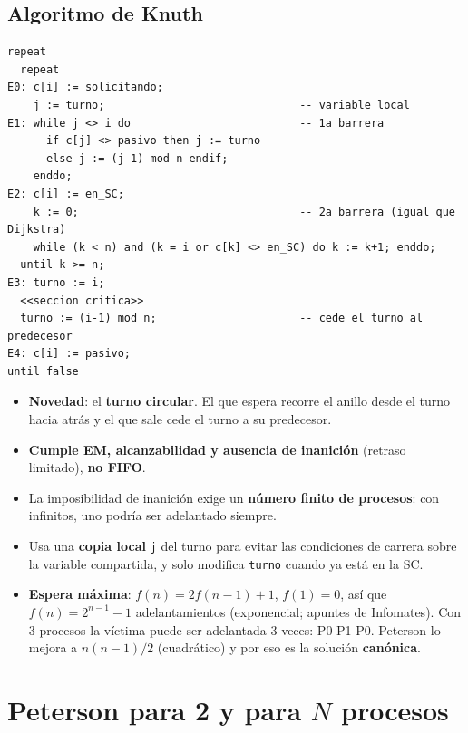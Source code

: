 \documentclass[11pt,a4paper,oneside]{report}
\begin{document}
\subsection{Algoritmo de Knuth}
\begin{lstlisting}
repeat
  repeat
E0: c[i] := solicitando;
    j := turno;                              -- variable local
E1: while j <> i do                          -- 1a barrera
      if c[j] <> pasivo then j := turno
      else j := (j-1) mod n endif;
    enddo;
E2: c[i] := en_SC;
    k := 0;                                  -- 2a barrera (igual que Dijkstra)
    while (k < n) and (k = i or c[k] <> en_SC) do k := k+1; enddo;
  until k >= n;
E3: turno := i;
  <<seccion critica>>
  turno := (i-1) mod n;                      -- cede el turno al predecesor
E4: c[i] := pasivo;
until false
\end{lstlisting}
\begin{itemize}[leftmargin=*]
  \item \textbf{Novedad}: el \textbf{turno circular}. El que espera recorre el anillo desde el turno hacia atrás y
        el que sale cede el turno a su predecesor.
  \item \textbf{Cumple EM, alcanzabilidad y ausencia de inanición} (retraso limitado), \textbf{no FIFO}.
  \item La imposibilidad de inanición exige un \textbf{número finito de procesos}: con infinitos, uno podría ser
        adelantado siempre.
  \item Usa una \textbf{copia local} \texttt{j} del turno para evitar las condiciones de carrera sobre la variable
        compartida, y solo modifica \texttt{turno} cuando ya está en la SC.
  \item \textbf{Espera máxima}: $f(n) = 2f(n-1) + 1$, $f(1) = 0$, así que $f(n) = 2^{n-1}-1$ adelantamientos
        (exponencial; apuntes de Infomates). Con 3 procesos la víctima puede ser adelantada 3 veces: P0 P1 P0.
        Peterson lo mejora a $n(n-1)/2$ (cuadrático) y por eso es la solución \textbf{canónica}.
\end{itemize}

\section{Peterson para 2 y para $N$ procesos}
\end{document}
